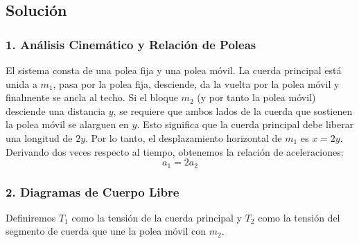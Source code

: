 \documentclass[12pt, a4paper]{article}
\begin{document}
\begin{center}
\end{center}

\subsection*{Solución}

\subsubsection*{1. Análisis Cinemático y Relación de Poleas}
El sistema consta de una polea fija y una polea móvil. La cuerda principal está unida a $m_1$, pasa por la polea fija, desciende, da la vuelta por la polea móvil y finalmente se ancla al techo.
Si el bloque $m_2$ (y por tanto la polea móvil) desciende una distancia $y$, se requiere que ambos lados de la cuerda que sostienen la polea móvil se alarguen en $y$. Esto significa que la cuerda principal debe liberar una longitud de $2y$. 
Por lo tanto, el desplazamiento horizontal de $m_1$ es $x = 2y$.
Derivando dos veces respecto al tiempo, obtenemos la relación de aceleraciones:
$$ a_1 = 2 a_2 $$

\subsubsection*{2. Diagramas de Cuerpo Libre}
Definiremos $T_1$ como la tensión de la cuerda principal y $T_2$ como la tensión del segmento de cuerda que une la polea móvil con $m_2$.
\end{document}
